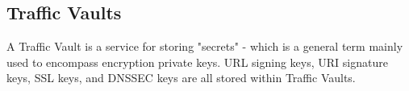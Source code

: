 %
%

\subsection{Traffic Vaults}
A Traffic Vault is a service for storing "secrets" - which is a general term
mainly used to encompass encryption private keys. URL signing keys, URI
signature keys, SSL keys, and DNSSEC keys are all stored within Traffic Vaults.



